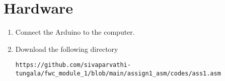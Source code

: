 \documentclass[10pt, a4paper]{article}
\begin{document}
	\section{Hardware}
	\begin{enumerate}[1.]
\item Connect the Arduino to the computer.
\item Download the following directory
\begin{lstlisting}
https://github.com/sivaparvathi-tungala/fwc_module_1/blob/main/assign1_asm/codes/ass1.asm
\end{lstlisting}
\end{enumerate}


\end{document}

